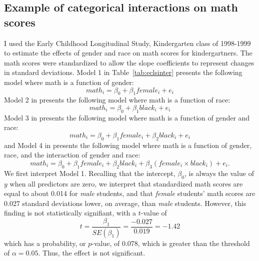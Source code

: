 \subsection{Example of categorical interactions on math scores}
  I used the Early Childhood Longitudinal Study, Kindergarten class of 1998-1999 to estimate the effects of gender and race on math scores for kindergartners. The math scores were standardized to allow the slope coefficients to represent changes in standard deviations. Model 1 in Table~\ref{tab:eclsinter} presents the following model where math is a function of gender:
\[
math_i=\beta_0+\beta_1female_i+e_i
\]
Model 2 in presents the following model where math is a function of race:
\[
math_i=\beta_0+\beta_1black_i+e_i
\]
Model 3 in presents the following model where math is a function of gender and race:
\[
math_i=\beta_0+\beta_1female_i+\beta_2black_i+e_i
\]
and Model 4 in presents the following model where math is a function of gender, race, and the interaction of gender and race:
\[
math_i=\beta_0+\beta_1female_i+\beta_2black_i+\beta_3\left(female_i\times black_i\right)+e_i.
\]
We first interpret Model 1. Recalling that the intercept, $\beta_0$, is always the value of $y$ when all predictors are zero, we interpret that standardized math scores are equal to about 0.014 for {\it male} students, and that {\it female} students' math scores are 0.027 standard deviations lower, on average, than {\it male} students. However, this finding is not statistically signifiant, with a $t$-value of
\[
t=\frac{\beta_1}{SE\left(\beta_1\right)}=\frac{-0.027}{0.019}=-1.42
\]
which has a probability, or $p$-value, of 0.078, which is greater than the threshold of $\alpha = 0.05$. Thus, the effect is not significant.

